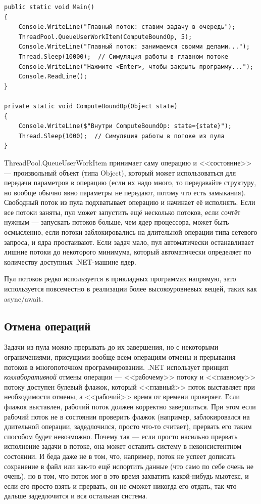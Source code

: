 \documentclass[a5paper]{article}
\begin{document}
\begin{verbatim}
public static void Main() 
{
    Console.WriteLine("Главный поток: ставим задачу в очередь");
    ThreadPool.QueueUserWorkItem(ComputeBoundOp, 5);
    Console.WriteLine("Главный поток: занимаемся своими делами...");
    Thread.Sleep(10000);  // Симуляция работы в главном потоке
    Console.WriteLine("Нажмите <Enter>, чтобы закрыть программу...");
    Console.ReadLine();
}

private static void ComputeBoundOp(Object state) 
{
    Console.WriteLine($"Внутри ComputeBoundOp: state={state}");
    Thread.Sleep(1000);  // Симуляция работы в потоке из пула
}
\end{verbatim}

ThreadPool.QueueUserWorkItem принимает саму операцию и <<состояние>> --- произвольный объект (типа Object), который может использоваться для передачи параметров в операцию (если их надо много, то передавайте структуру, но вообще обычно явно параметры не передают, потому что есть замыкания). Свободный поток из пула подхватывает операцию и начинает её исполнять. Если все потоки заняты, пул может запустить ещё несколько потоков, если сочтёт нужным --- запускать потоков больше, чем ядер процессора, может быть осмысленно, если потоки заблокировались на длительной операции типа сетевого запроса, и ядра простаивают. Если задач мало, пул автоматически останавливает лишние потоки до некоторого минимума, который автоматически определяет по количеству доступных .NET-машине ядер.

Пул потоков редко используется в прикладных программах напрямую, зато используется повсеместно в реализации более высокоуровневых вещей, таких как async/await.

\subsection{Отмена операций}

Задачи из пула можно прерывать до их завершения, но с некоторыми ограничениями, присущими вообще всем операциям отмены и прерывания потоков в многопоточном программировании. .NET использует принцип \textit{коллаборативной} отмены операции --- <<рабочему>> потоку и <<главному>> потоку доступен булевый флажок, который <<главный>> поток выставляет при необходимости отмены, а <<рабочий>> время от времени проверяет. Если флажок выставлен, рабочий поток должен корректно завершиться. При этом если рабочий поток не в состоянии проверить флажок (например, заблокировался на длительной операции, задедлочился, просто что-то считает), прервать его таким способом будет невозможно. Почему так --- если просто насильно прервать исполнение задачи в потоке, она может оставить систему в неконсистентном состоянии. И беда даже не в том, что, например, поток не успеет дописать сохранение в файл или как-то ещё испортить данные (что само по себе очень не очень), но в том, что поток мог в это время захватить какой-нибудь мьютекс, и если его просто взять и прервать, он не сможет никогда его отдать, так что дальше задедлочится и вся остальная система. 
\end{document}
